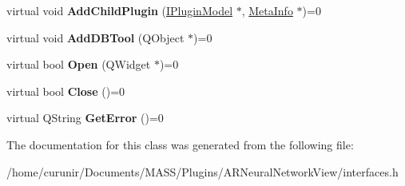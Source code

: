 \begin{DoxyCompactItemize}
\item 
virtual void {\bfseries Add\+Child\+Plugin} (\hyperlink{class_i_plugin_model}{I\+Plugin\+Model} $\ast$, \hyperlink{struct_meta_info}{Meta\+Info} $\ast$)=0\hypertarget{class_i_plugin_model_aff406b0571f6dc77488c315e0df0f563}{}\label{class_i_plugin_model_aff406b0571f6dc77488c315e0df0f563}

\item 
virtual void {\bfseries Add\+D\+B\+Tool} (Q\+Object $\ast$)=0\hypertarget{class_i_plugin_model_a2db1262756c4a587fd6cd2d7191841fb}{}\label{class_i_plugin_model_a2db1262756c4a587fd6cd2d7191841fb}

\item 
virtual bool {\bfseries Open} (Q\+Widget $\ast$)=0\hypertarget{class_i_plugin_model_ac1c51202f69db707ca56e8f3c78ce163}{}\label{class_i_plugin_model_ac1c51202f69db707ca56e8f3c78ce163}

\item 
virtual bool {\bfseries Close} ()=0\hypertarget{class_i_plugin_model_a3f9ce2298f73283fec68fc908db14e57}{}\label{class_i_plugin_model_a3f9ce2298f73283fec68fc908db14e57}

\item 
virtual Q\+String {\bfseries Get\+Error} ()=0\hypertarget{class_i_plugin_model_ad42778c15ce3e8fdb9524a6dfd61792a}{}\label{class_i_plugin_model_ad42778c15ce3e8fdb9524a6dfd61792a}

\end{DoxyCompactItemize}


The documentation for this class was generated from the following file\+:\begin{DoxyCompactItemize}
\item 
/home/curunir/\+Documents/\+M\+A\+S\+S/\+Plugins/\+A\+R\+Neural\+Network\+View/interfaces.\+h\end{DoxyCompactItemize}
